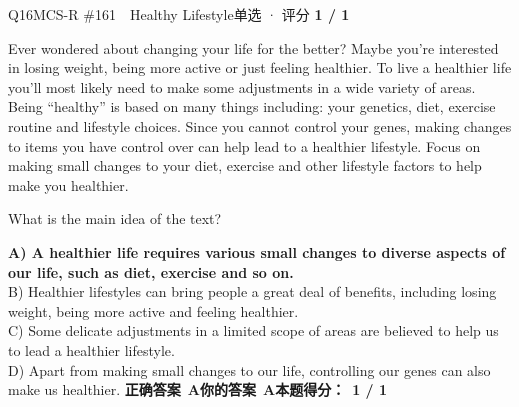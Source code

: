 \begin{qblock}{Q16\quad MCS-R \#161\ \ Healthy Lifestyle}{单选 · 评分 \textcolor{cAccent}{\bfseries 1 / 1}}
\begin{promptbox}
Ever wondered about changing your life for the better? Maybe you're interested in losing weight, being more active or just feeling healthier. To live a healthier life you'll most likely need to make some adjustments in a wide variety of areas. Being ``healthy'' is based on many things including: your genetics, diet, exercise routine and lifestyle choices. Since you cannot control your genes, making changes to items you have control over can help lead to a healthier lifestyle. Focus on making small changes to your diet, exercise and other lifestyle factors to help make you healthier.
\end{promptbox}
\begin{notebox}What is the main idea of the text?\end{notebox}
{\small
{\color{cFix}\textbf{A) A healthier life requires various small changes to diverse aspects of our life, such as diet, exercise and so on.}}\\
B) Healthier lifestyles can bring people a great deal of benefits, including losing weight, being more active and feeling healthier.\\
C) Some delicate adjustments in a limited scope of areas are believed to help us to lead a healthier lifestyle.\\
D) Apart from making small changes to our life, controlling our genes can also make us healthier.}
\smallskip
\textbf{正确答案}\ \textcolor{cFix}{\bfseries A}\qquad\textbf{你的答案}\ \textcolor{cFix}{\bfseries A}\qquad\textbf{本题得分：}\ {\color{cAccent}\bfseries 1 / 1}
\end{qblock}
